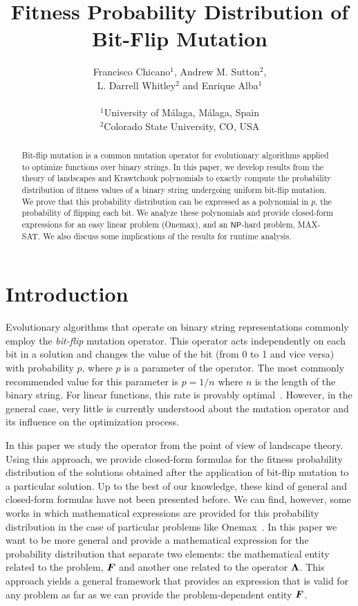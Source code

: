 \documentclass{article}
\title{Fitness Probability Distribution of Bit-Flip Mutation}
\author{Francisco Chicano$^1$, Andrew M. Sutton$^2$, \\L. Darrell Whitley$^2$ and Enrique Alba$^1$ \\
\\
$^1$University of M\'alaga, M\'alaga, Spain\\
$^2$Colorado State University, CO, USA
}
\date{}
\def\vec#1{\mathchoice{\mbox{\boldmath$\displaystyle#1$}}
  {\mbox{\boldmath$\textstyle#1$}}
  {\mbox{\boldmath$\scriptstyle#1$}}
  {\mbox{\boldmath$\scriptscriptstyle#1$}}}
\newcommand{\NP}[0]{\mathsf{NP}}
\begin{document}
\maketitle

\begin{abstract}
Bit-flip mutation is a common mutation operator for evolutionary algorithms applied to optimize functions over binary strings. In this paper, we develop results from the theory of landscapes and Krawtchouk polynomials to exactly compute the probability distribution of fitness values of a binary string undergoing uniform bit-flip mutation. We prove that this probability distribution can be expressed as a polynomial in $p$, the probability of flipping each bit. We analyze these polynomials and provide closed-form expressions for an easy linear problem (Onemax), and an $\NP$-hard problem, MAX-SAT. We also discuss some implications of the results for runtime analysis.
\end{abstract}







\parskip=0.00in


\section{Introduction}
\label{sec:intro}

Evolutionary algorithms that operate on binary string representations commonly employ the \emph{bit-flip} mutation operator.  This operator acts independently on each bit in a solution and changes the value of the bit (from 0 to 1 and vice versa) with probability $p$, where $p$ is a parameter of the operator.  The most commonly recommended value for this parameter is $p=1/n$ where $n$ is the length of the binary string. For linear functions, this rate is provably optimal~\citep{Witt2013tight}. However, in the general case, very little is currently understood about the mutation operator and its influence on the optimization process.

In this paper we study the operator from the point of view of landscape theory. Using this approach, we provide closed-form formulas for the fitness probability distribution of the solutions obtained after the application of bit-flip mutation to a particular solution. Up to the best of our knowledge, these kind of general and closed-form formulas have not been presented before. We can find, however, some works in which mathematical expressions are provided for this probability distribution in the case of particular problems like Onemax~\citep{Garnier1999}. In this paper we want to be more general and provide a mathematical expression for the probability distribution that separate two elements: the mathematical entity related to the problem, $\vec{F}$ and another one related to the operator $\vec{\Lambda}$. This approach yields a general framework that provides an expression that is valid for any problem as far as we can provide the problem-dependent entity $\vec{F}$.
\end{document}
